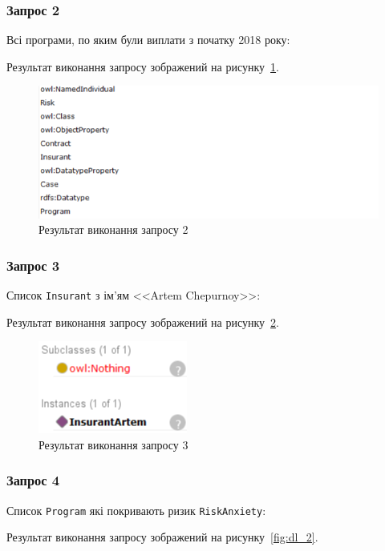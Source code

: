 \subsubsection*{Запрос 2}
Всі програми, по яким були виплати з початку 2018 року:
 

Результат виконання запросу зображений на рисунку~\ref{fig:sparql_2}.

\begin{figure}[H]
	\centering
	    \includegraphics{sparql_2}
	\caption{Результат виконання запросу 2}
	\label{fig:sparql_2}
\end{figure}

\subsubsection*{Запрос 3}
Список \texttt{Insurant} з ім'ям <<Artem Chepurnoy>>:
 

Результат виконання запросу зображений на рисунку~\ref{fig:dl_1}.

\begin{figure}[H]
	\centering
	    \includegraphics{dl_1}
	\caption{Результат виконання запросу 3}
	\label{fig:dl_1}
\end{figure}

\subsubsection*{Запрос 4}
Список \texttt{Program} які покривають ризик \texttt{RiskAnxiety}:
 

Результат виконання запросу зображений на рисунку~\ref{fig:dl_2}.

